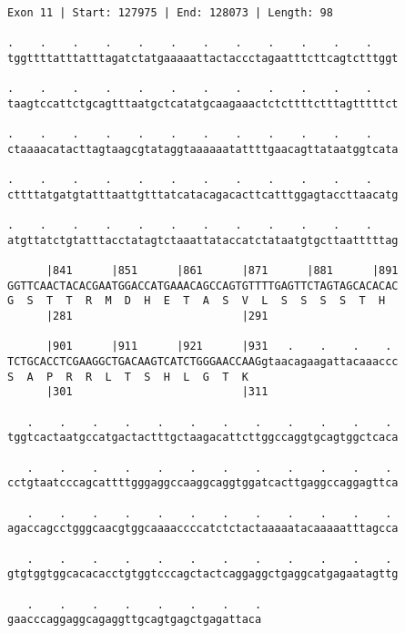 \documentclass{article}
\begin{document}
\begin{Verbatim}
Exon 11 | Start: 127975 | End: 128073 | Length: 98
 
.    .    .    .    .    .    .    .    .    .    .    .    
tggttttatttatttagatctatgaaaaattactaccctagaatttcttcagtctttggt
  
.    .    .    .    .    .    .    .    .    .    .    .    
taagtccattctgcagtttaatgctcatatgcaagaaactctcttttctttagtttttct
  
.    .    .    .    .    .    .    .    .    .    .    .    
ctaaaacatacttagtaagcgtataggtaaaaaatattttgaacagttataatggtcata
  
.    .    .    .    .    .    .    .    .    .    .    .    
cttttatgatgtatttaattgtttatcatacagacacttcatttggagtaccttaacatg
  
.    .    .    .    .    .    .    .    .    .    .    .    
atgttatctgtatttacctatagtctaaattataccatctataatgtgcttaatttttag
  
      |841      |851      |861      |871      |881      |891
GGTTCAACTACACGAATGGACCATGAAACAGCCAGTGTTTTGAGTTCTAGTAGCACACAC
G  S  T  T  R  M  D  H  E  T  A  S  V  L  S  S  S  S  T  H  
      |281                          |291                    
  
      |901      |911      |921      |931   .    .    .    . 
TCTGCACCTCGAAGGCTGACAAGTCATCTGGGAACCAAGgtaacagaagattacaaaccc
S  A  P  R  R  L  T  S  H  L  G  T  K                       
      |301                          |311                    
  
   .    .    .    .    .    .    .    .    .    .    .    . 
tggtcactaatgccatgactactttgctaagacattcttggccaggtgcagtggctcaca
  
   .    .    .    .    .    .    .    .    .    .    .    . 
cctgtaatcccagcattttgggaggccaaggcaggtggatcacttgaggccaggagttca
  
   .    .    .    .    .    .    .    .    .    .    .    . 
agaccagcctgggcaacgtggcaaaaccccatctctactaaaaatacaaaaatttagcca
  
   .    .    .    .    .    .    .    .    .    .    .    . 
gtgtggtggcacacacctgtggtcccagctactcaggaggctgaggcatgagaatagttg
  
   .    .    .    .    .    .    .    .
gaacccaggaggcagaggttgcagtgagctgagattaca
\end{Verbatim}
\newpage
\end{document}
